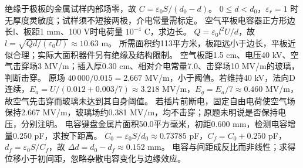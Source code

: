 绝缘于极板的金属试样内部场零，故 $C=\varepsilon_0S/(d_0-d)$。
\crosscheck $0\le d<d_0$，$\varepsilon_r=1$ 时无厚度灵敏度；试样须不短接两极，介电常量需标定。
\problemtext 空气平板电容器正方形边长l、板距1 mm、100 V时电荷量 $10^{-4}$ C，求边长。
\workings $Q=\varepsilon_0 l^2 U/d$，故 $l=\sqrt{Qd/(\varepsilon_0U)}\approx10.63$ m。
\crosscheck 所需面积约113平方米，板距远小于边长，平板近似合理；实际大面积器件另有绝缘及结构限制。
\problemtext 空气板距1.5 cm、电压40 kV、空气击穿场3 MV/m；插入厚0.30 cm、相对介电常量7.0、击穿场10 MV/m的玻璃，判断击穿。
\workings 原场 $40\,000/0.015=2.667$ MV/m，小于阈值。若维持40 kV，法向D连续，$E_a=U/(0.012+0.003/7)\approx3.218$ MV/m，$E_g=E_a/7\approx0.460$ MV/m，故空气先击穿而玻璃未达到其自身阈值。
\crosscheck 若插片前断电，固定自由电荷使空气场保持2.667 MV/m，玻璃场约0.381 MV/m，均不击穿；原题未明说是否保持电压，分别注明。
\problemtext 电容键盘金属片面积50.0平方毫米，初距0.600 mm，检测电容增量0.250 pF，求按下距离。
\workings $C_0=\varepsilon_0S/d_0\approx0.73785$ pF，$C_f=C_0+0.250$ pF，$d_f=\varepsilon_0S/C_f$，故 $\Delta d=d_0-d_f\approx0.152$ mm。
\crosscheck 电容与间距成反比而非线性；求得位移小于初间距，忽略杂散电容变化与边缘效应。
